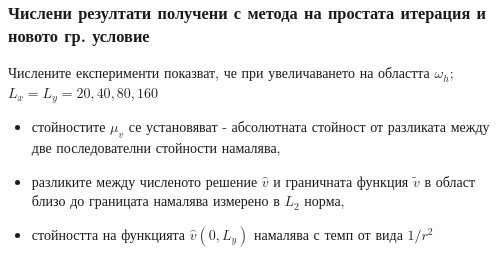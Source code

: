 \documentclass{beamer}
\begin{document}
\begin{frame}
\frametitle{Числени резултати получени с метода на простата итерация и новото гр. условие}
Числените експерименти показват, че при увеличаването на областта $\omega_h$; $L_x = L_y = 20, 40, 80, 160$
\begin{itemize}
  \item стойностите $\mu_v$ се установяват - абсолютната стойност от разликата между две последователни стойности намалява,
  \item разликите между численото решение $\widehat v$ и граничната функция $\tilde v$ в област близо до границата намалява измерено в $L_2$ норма,
  \item стойността на функцията $\widehat v(0,L_y)$ намалява с темп от вида $1/r^2$

\end{itemize}
\end{frame}
\end{document}
